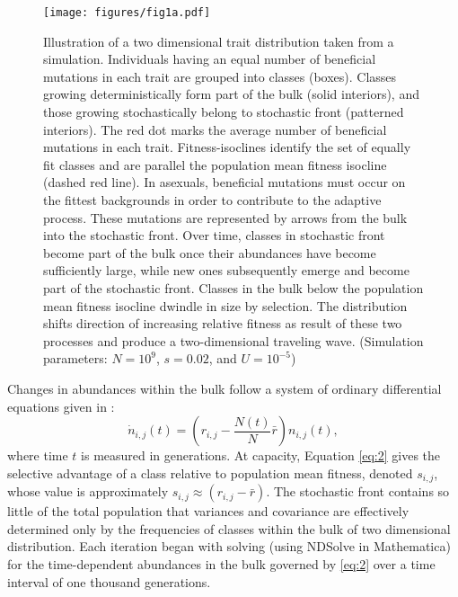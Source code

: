 \documentclass[9pt,twocolumn,twoside]{gsajnl}
\begin{document}
\begin{figure}[!ht]
\texttt{[image: figures/fig1a.pdf]}
\caption{Illustration of a two dimensional trait distribution taken from a simulation. Individuals having an equal number of beneficial mutations in each trait are grouped into classes (boxes). Classes growing deterministically form part of the bulk (solid interiors), and those growing stochastically belong to stochastic front (patterned interiors). The red dot marks the average number of beneficial mutations in each trait. Fitness-isoclines identify the set of equally fit classes and are parallel the population mean fitness isocline (dashed red line). In asexuals, beneficial mutations must occur on the fittest backgrounds in order to contribute to the adaptive process. These mutations are represented by arrows from the bulk into the stochastic front. Over time, classes in stochastic front become part of the bulk once their abundances have become sufficiently large, while new ones subsequently emerge and become part of the stochastic front. Classes in the bulk below the population mean fitness isocline dwindle in size by selection. The distribution shifts direction of increasing relative fitness as result of these two processes and produce a two-dimensional traveling wave. (Simulation parameters: $N=10^9$, $s=0.02$, and $U=10^{-5}$)}\label{fig:1}
% 
% 
% 
\end{figure}

Changes in abundances within the bulk follow a system of ordinary differential equations given in \cite[page 27]{Crow1970} :
\begin{equation} \label{eq:2}
\dot{n}_{i,j}(t) =\left (r_{i,j}-\frac{N(t)}{N}\bar{r}\right) n_{i,j}(t),
\end{equation}
where time $t$ is measured in generations. At capacity, Equation \ref{eq:2} gives the selective advantage of a class relative to population mean fitness, denoted $s_{i,j}$, whose value is approximately  $s_{i,j} \approx (r_{i,j}-\bar{r})$. The stochastic front contains so little of the total population that variances and covariance are effectively determined only by the frequencies of classes within the bulk of two dimensional distribution. Each iteration began with solving (using NDSolve in Mathematica) for the time-dependent abundances in the bulk governed by \ref{eq:2} over a time interval of one thousand generations.\par
\end{document}
